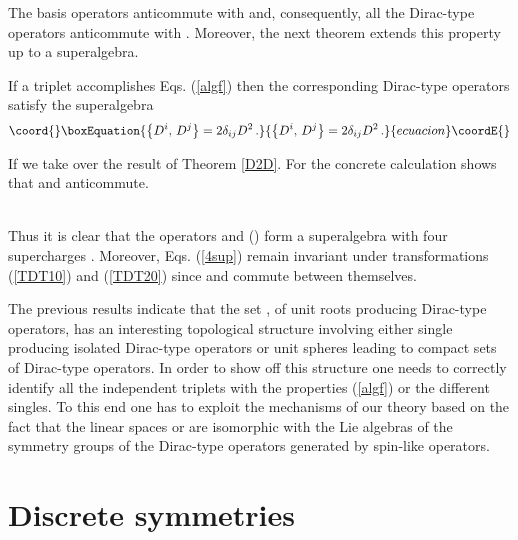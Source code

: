 \documentclass[a4paper,12pt]{article}
\begin{document}
The basis operators \coordHE{} anticommute with \coordHE{} and, consequently, all the 
Dirac-type operators \coordHE{} anticommute with \coordHE{}. Moreover, the next 
theorem extends this property up to a \coordHE{} superalgebra. 
\begin{theor}
If a triplet \coordHE{} accomplishes  Eqs. (\ref{algf}) then 
the corresponding Dirac-type operators satisfy the superalgebra
\begin{equation}\coord{}\boxEquation{\label{4sup}
\left\{D^i,\,D^j\right\}=2\delta_{ij} D^2\,. 
}{\left\{D^i,\,D^j\right\}=2\delta_{ij} D^2\,. 
}{ecuacion}\coordE{}\end{equation}
\end{theor}
\begin{demo}
If \coordHE{} we take over the result of Theorem \ref{D2D}. For \coordHE{} the 
concrete calculation shows that \coordHE{} and \coordHE{} anticommute. 
 \end{demo}\\
Thus it is clear that the operators \coordHE{} and \coordHE{} (\coordHE{}) form a 
superalgebra with four supercharges \cite{CV}. Moreover, Eqs. (\ref{4sup}) 
remain invariant under transformations (\ref{TDT10}) and (\ref{TDT20}) 
since \coordHE{} and \coordHE{} commute between themselves. 

The previous results indicate that the set \coordHE{}, of unit roots 
producing Dirac-type operators, has an interesting topological structure 
involving either single \coordHE{}  producing 
isolated  Dirac-type operators  or unit spheres  \coordHE{} leading to 
compact sets of Dirac-type operators. In order to show off this structure one 
needs to correctly identify all the independent triplets with the properties 
(\ref{algf}) or the different singles. To this end one has to exploit 
the mechanisms of our theory based on the fact that the linear spaces \coordHE{} or 
\coordHE{} are isomorphic with the Lie algebras of the symmetry  groups of the  
Dirac-type operators generated by spin-like operators.

\section{Discrete symmetries}
\end{document}

